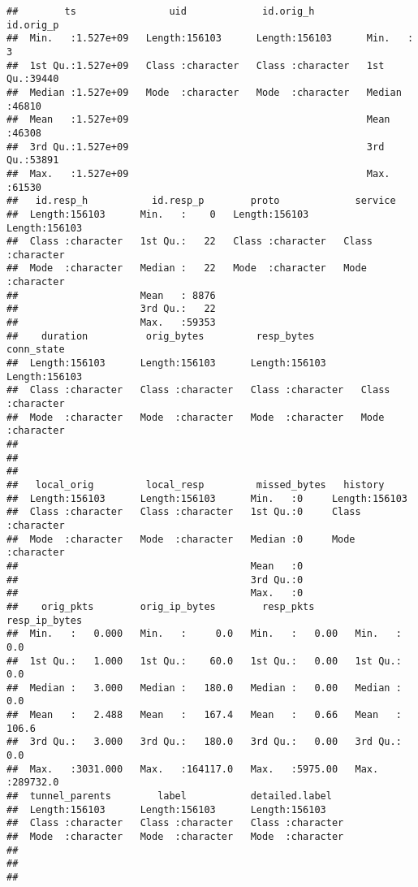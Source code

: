 \documentclass[
]{article}
\begin{document}
\begin{verbatim}
##        ts                uid             id.orig_h           id.orig_p    
##  Min.   :1.527e+09   Length:156103      Length:156103      Min.   :    3  
##  1st Qu.:1.527e+09   Class :character   Class :character   1st Qu.:39440  
##  Median :1.527e+09   Mode  :character   Mode  :character   Median :46810  
##  Mean   :1.527e+09                                         Mean   :46308  
##  3rd Qu.:1.527e+09                                         3rd Qu.:53891  
##  Max.   :1.527e+09                                         Max.   :61530  
##   id.resp_h           id.resp_p        proto             service         
##  Length:156103      Min.   :    0   Length:156103      Length:156103     
##  Class :character   1st Qu.:   22   Class :character   Class :character  
##  Mode  :character   Median :   22   Mode  :character   Mode  :character  
##                     Mean   : 8876                                        
##                     3rd Qu.:   22                                        
##                     Max.   :59353                                        
##    duration          orig_bytes         resp_bytes         conn_state       
##  Length:156103      Length:156103      Length:156103      Length:156103     
##  Class :character   Class :character   Class :character   Class :character  
##  Mode  :character   Mode  :character   Mode  :character   Mode  :character  
##                                                                             
##                                                                             
##                                                                             
##   local_orig         local_resp         missed_bytes   history         
##  Length:156103      Length:156103      Min.   :0     Length:156103     
##  Class :character   Class :character   1st Qu.:0     Class :character  
##  Mode  :character   Mode  :character   Median :0     Mode  :character  
##                                        Mean   :0                       
##                                        3rd Qu.:0                       
##                                        Max.   :0                       
##    orig_pkts        orig_ip_bytes        resp_pkts       resp_ip_bytes     
##  Min.   :   0.000   Min.   :     0.0   Min.   :   0.00   Min.   :     0.0  
##  1st Qu.:   1.000   1st Qu.:    60.0   1st Qu.:   0.00   1st Qu.:     0.0  
##  Median :   3.000   Median :   180.0   Median :   0.00   Median :     0.0  
##  Mean   :   2.488   Mean   :   167.4   Mean   :   0.66   Mean   :   106.6  
##  3rd Qu.:   3.000   3rd Qu.:   180.0   3rd Qu.:   0.00   3rd Qu.:     0.0  
##  Max.   :3031.000   Max.   :164117.0   Max.   :5975.00   Max.   :289732.0  
##  tunnel_parents        label           detailed.label    
##  Length:156103      Length:156103      Length:156103     
##  Class :character   Class :character   Class :character  
##  Mode  :character   Mode  :character   Mode  :character  
##                                                          
##                                                          
## 
\end{verbatim}
\end{document}
